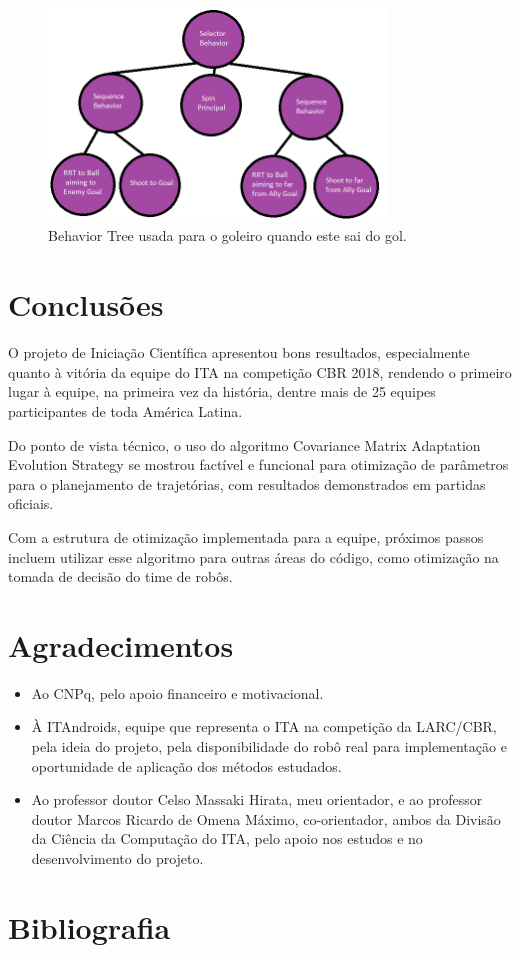 \documentclass[a4paper,12pt]{article}
\begin{document}
\begin{figure}[H]
	\centering
	\includegraphics[width=0.8\textwidth]{figures/LastGoalierOutOfGoal.png}
   	\caption{Behavior Tree usada para o goleiro quando este sai do gol.} \label{fig:OutOfGoal_BT}
\end{figure}


\section{Conclusões}

O projeto de Iniciação Científica apresentou bons resultados, especialmente quanto à vitória da equipe do ITA na competição CBR 2018, rendendo o primeiro lugar à equipe, na primeira vez da história, dentre mais de 25 equipes participantes de toda América Latina.

Do ponto de vista técnico, o uso do algoritmo Covariance Matrix Adaptation Evolution Strategy se mostrou factível e funcional para otimização de parâmetros para o planejamento de trajetórias, com resultados demonstrados em partidas oficiais.

Com a estrutura de otimização implementada para a equipe, próximos passos incluem utilizar esse algoritmo para outras áreas do código, como otimização na tomada de decisão do time de robôs.

\section{Agradecimentos}

\begin{itemize}
\item Ao CNPq, pelo apoio financeiro e motivacional.
\item À ITAndroids, equipe que representa o ITA na competição da LARC/CBR, pela ideia do projeto, pela disponibilidade do robô real para implementação e oportunidade de aplicação dos métodos estudados.
\item Ao professor doutor Celso Massaki Hirata, meu orientador, e ao professor doutor Marcos Ricardo de Omena Máximo, co-orientador, ambos da Divisão da Ciência da Computação do ITA, pelo apoio nos estudos e no desenvolvimento do projeto.

\end{itemize}

\section{Bibliografia}

\printbibliography
\end{document}
